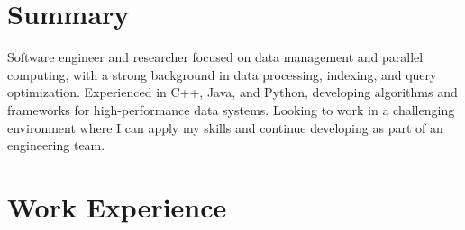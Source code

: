 \documentclass[a4paper,12pt]{article}
\makeatletter
\newenvironment{jobshort}[2]
    {
    \begin{tabularx}{\linewidth}{@{}l X r@{}}
    \textbf{#1} & \hfill &  #2 \\[3.75pt]
    \end{tabularx}
    }
    {
    }
\makeatother
\begin{document}
\section{Summary}

\small Software engineer and researcher focused on data management and parallel computing, with a strong background in data processing, indexing, and query optimization. Experienced in C++, Java, and Python, developing algorithms and frameworks for high-performance data systems. Looking to work in a challenging environment where I can apply my skills and continue developing as part of an engineering team.



\section{Work Experience}

\end{document}

